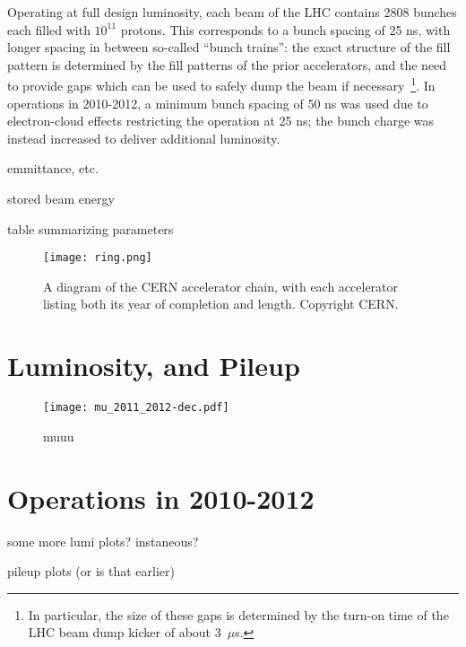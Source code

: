 Operating at full design luminosity, each beam of the LHC contains 2808 bunches each filled with $10^{11}$ protons. This corresponds to a bunch spacing of 25 ns, with longer spacing in between so-called ``bunch trains'': the exact structure of the fill pattern is determined by the fill patterns of the prior accelerators, and the need to provide gaps which can be used to safely dump the beam if necessary~\cite{lhc-bunches}\footnote{In particular, the size of these gaps is determined by the turn-on time of the LHC beam dump kicker of about 3~$\mu$s.}. In operations in 2010-2012, a minimum bunch spacing of 50 ns was used due to electron-cloud effects restricting the operation at 25 ns; the bunch charge was instead increased to deliver additional luminosity. 

emmittance, etc.

stored beam energy

table summarizing parameters


\begin{figure}
\centering
\texttt{[image: ring.png]}
\label{fig:lhc:ring}
\caption{A diagram of the CERN accelerator chain, with each accelerator listing both its year of completion and length. Copyright CERN.}
\end{figure}


\section{Luminosity, and Pileup}
\label{lhc:luminosity-and-pileup}



\begin{figure}
\centering
\texttt{[image: mu\_2011\_2012-dec.pdf]}
\label{fig:lhc:mu-profile}
\caption{muuu}
\end{figure}



\section{Operations in 2010-2012}

some more lumi plots? instaneous?

pileup plots (or is that earlier)




